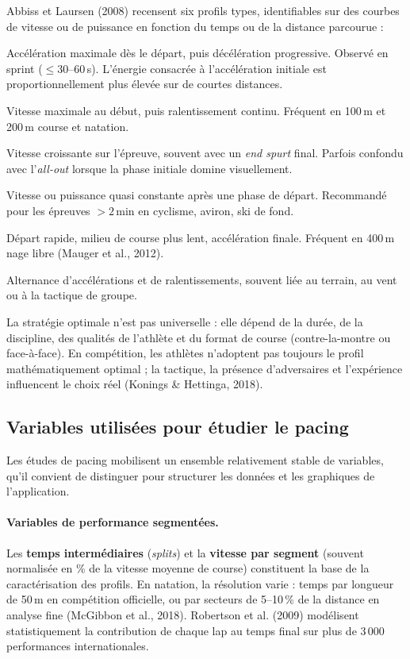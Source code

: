 \documentclass[11pt,a4paper]{article}
\begin{document}
Abbiss et Laursen (2008) recensent six profils types, identifiables sur des courbes de vitesse ou de puissance en fonction du temps ou de la distance parcourue :

\begin{description}[leftmargin=1.5cm, style=nextline]
    \item[\textit{All-out} (départ maximal)] Accélération maximale dès le départ, puis décélération progressive. Observé en sprint ($\leq 30$--60\,s). L'énergie consacrée à l'accélération initiale est proportionnellement plus élevée sur de courtes distances.
    \item[Positif] Vitesse maximale au début, puis ralentissement continu. Fréquent en 100\,m et 200\,m course et natation.
    \item[Négatif] Vitesse croissante sur l'épreuve, souvent avec un \textit{end spurt} final. Parfois confondu avec l'\textit{all-out} lorsque la phase initiale domine visuellement.
    \item[Régulier (\textit{even})] Vitesse ou puissance quasi constante après une phase de départ. Recommandé pour les épreuves $> 2$\,min en cyclisme, aviron, ski de fond.
    \item[Parabolique] Départ rapide, milieu de course plus lent, accélération finale. Fréquent en 400\,m nage libre (Mauger et al., 2012).
    \item[Variable] Alternance d'accélérations et de ralentissements, souvent liée au terrain, au vent ou à la tactique de groupe.
\end{description}

La stratégie optimale n'est pas universelle : elle dépend de la durée, de la discipline, des qualités de l'athlète et du format de course (contre-la-montre ou face-à-face). En compétition, les athlètes n'adoptent pas toujours le profil mathématiquement optimal ; la tactique, la présence d'adversaires et l'expérience influencent le choix réel (Konings \& Hettinga, 2018).

\subsection{Variables utilisées pour étudier le pacing}

Les études de pacing mobilisent un ensemble relativement stable de variables, qu'il convient de distinguer pour structurer les données et les graphiques de l'application.

\paragraph{Variables de performance segmentées.}
Les \textbf{temps intermédiaires} (\textit{splits}) et la \textbf{vitesse par segment} (souvent normalisée en \% de la vitesse moyenne de course) constituent la base de la caractérisation des profils. En natation, la résolution varie : temps par longueur de 50\,m en compétition officielle, ou par secteurs de 5--10\,\% de la distance en analyse fine (McGibbon et al., 2018). Robertson et al. (2009) modélisent statistiquement la contribution de chaque lap au temps final sur plus de 3\,000 performances internationales.
\end{document}
